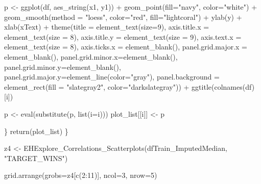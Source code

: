 \documentclass[
]{article}
\newenvironment{Shaded}{\begin{snugshade}}{\end{snugshade}}
\newcommand{\AttributeTok}[1]{\textcolor[rgb]{0.77,0.63,0.00}{#1}}
\newcommand{\DecValTok}[1]{\textcolor[rgb]{0.00,0.00,0.81}{#1}}
\newcommand{\FunctionTok}[1]{\textcolor[rgb]{0.00,0.00,0.00}{#1}}
\newcommand{\NormalTok}[1]{#1}
\newcommand{\OtherTok}[1]{\textcolor[rgb]{0.56,0.35,0.01}{#1}}
\newcommand{\SpecialCharTok}[1]{\textcolor[rgb]{0.00,0.00,0.00}{#1}}
\newcommand{\StringTok}[1]{\textcolor[rgb]{0.31,0.60,0.02}{#1}}
\begin{document}
\begin{Shaded}
\begin{Highlighting}[]
\NormalTok{    p }\OtherTok{\textless{}{-}} \FunctionTok{ggplot}\NormalTok{(df, }\FunctionTok{aes\_string}\NormalTok{(x1, y1)) }\SpecialCharTok{+}
  \FunctionTok{geom\_point}\NormalTok{(}\AttributeTok{fill=}\StringTok{"navy"}\NormalTok{, }\AttributeTok{color=}\StringTok{"white"}\NormalTok{) }\SpecialCharTok{+}
  \FunctionTok{geom\_smooth}\NormalTok{(}\AttributeTok{method =} \StringTok{"loess"}\NormalTok{, }\AttributeTok{color=}\StringTok{"red"}\NormalTok{, }\AttributeTok{fill=}\StringTok{"lightcoral"}\NormalTok{) }\SpecialCharTok{+}
  \FunctionTok{ylab}\NormalTok{(y) }\SpecialCharTok{+}
    \FunctionTok{xlab}\NormalTok{(xText) }\SpecialCharTok{+}
    \FunctionTok{theme}\NormalTok{(}\AttributeTok{title =} \FunctionTok{element\_text}\NormalTok{(}\AttributeTok{size=}\DecValTok{9}\NormalTok{), }\AttributeTok{axis.title.x =} \FunctionTok{element\_text}\NormalTok{(}\AttributeTok{size =} \DecValTok{8}\NormalTok{), }\AttributeTok{axis.title.y =} \FunctionTok{element\_text}\NormalTok{(}\AttributeTok{size =} \DecValTok{9}\NormalTok{), }\AttributeTok{axis.text.x =} \FunctionTok{element\_text}\NormalTok{(}\AttributeTok{size =} \DecValTok{8}\NormalTok{), }\AttributeTok{axis.ticks.x =} \FunctionTok{element\_blank}\NormalTok{(), }\AttributeTok{panel.grid.major.x =} \FunctionTok{element\_blank}\NormalTok{(), }\AttributeTok{panel.grid.minor.x=}\FunctionTok{element\_blank}\NormalTok{(), }\AttributeTok{panel.grid.minor.y=}\FunctionTok{element\_blank}\NormalTok{(), }\AttributeTok{panel.grid.major.y=}\FunctionTok{element\_line}\NormalTok{(}\AttributeTok{color=}\StringTok{"gray"}\NormalTok{), }\AttributeTok{panel.background =} \FunctionTok{element\_rect}\NormalTok{(}\AttributeTok{fill =} \StringTok{"slategray2"}\NormalTok{, }\AttributeTok{color=}\StringTok{"darkslategray"}\NormalTok{)) }\SpecialCharTok{+}
  \FunctionTok{ggtitle}\NormalTok{(}\FunctionTok{colnames}\NormalTok{(df)[i])}

\NormalTok{  p }\OtherTok{\textless{}{-}} \FunctionTok{eval}\NormalTok{(}\FunctionTok{substitute}\NormalTok{(p, }\FunctionTok{list}\NormalTok{(}\AttributeTok{i=}\NormalTok{i)))}
\NormalTok{  plot\_list[[i]] }\OtherTok{\textless{}{-}}\NormalTok{ p }
    
\NormalTok{\}}
  \FunctionTok{return}\NormalTok{(plot\_list)}
\NormalTok{\}}

\NormalTok{z4 }\OtherTok{\textless{}{-}} \FunctionTok{EHExplore\_Correlations\_Scatterplots}\NormalTok{(dfTrain\_ImputedMedian, }\StringTok{"TARGET\_WINS"}\NormalTok{)}

\FunctionTok{grid.arrange}\NormalTok{(}\AttributeTok{grobs=}\NormalTok{z4[}\FunctionTok{c}\NormalTok{(}\DecValTok{2}\SpecialCharTok{:}\DecValTok{11}\NormalTok{)],  }\AttributeTok{ncol=}\DecValTok{3}\NormalTok{, }\AttributeTok{nrow=}\DecValTok{5}\NormalTok{)}
\end{Highlighting}
\end{Shaded}
\end{document}
